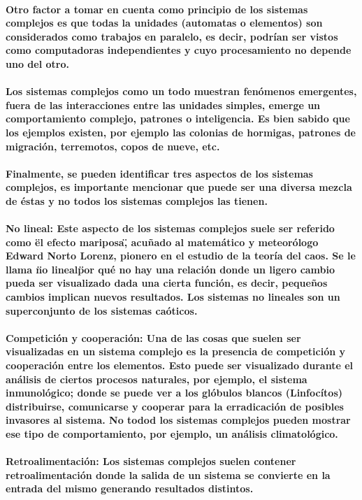      \paragraph{Otro factor a tomar en cuenta como principio de los sistemas complejos es que todas la unidades (automatas o elementos) son considerados como trabajos en paralelo, es decir, podrían ser vistos como computadoras independientes y cuyo procesamiento no depende uno del otro.}
      \paragraph{Los sistemas complejos como un todo muestran fenómenos emergentes, fuera de las interacciones entre las unidades simples, emerge un comportamiento complejo, patrones o inteligencia. Es bien sabido que los ejemplos existen, por ejemplo las colonias de hormigas, patrones de migración, terremotos, copos de nueve, etc.}
      \paragraph{Finalmente, se pueden identificar tres aspectos de los sistemas complejos, es importante mencionar que puede ser una diversa mezcla de éstas y no todos los sistemas complejos las tienen.}
      \paragraph{\textbf{No lineal}: Este aspecto de los sistemas complejos suele ser referido como \"el efecto mariposa\", acuñado al matemático y meteorólogo Edward Norto Lorenz, pionero en el estudio de la teoría del caos. Se le llama \"no lineal\" por qué no hay una relación donde un ligero cambio pueda ser visualizado dada una cierta función, es decir, pequeños cambios implican nuevos resultados. Los sistemas no lineales son un superconjunto de los sistemas caóticos.}
      \paragraph{\textbf{Competición y cooperación}: Una de las cosas que suelen ser visualizadas en un sistema complejo es la presencia de competición y cooperación entre los elementos. Esto puede ser visualizado durante el análisis de ciertos procesos naturales, por ejemplo, el sistema inmunológico; donde se puede ver a los glóbulos blancos (Linfocítos) distribuirse, comunicarse y cooperar para la erradicación de posibles invasores al sistema. No todod los sistemas complejos pueden mostrar ese tipo de comportamiento, por ejemplo, un análisis climatológico.}
      \paragraph{\textbf{Retroalimentación}: Los sistemas complejos suelen contener retroalimentación donde la salida de un sistema se convierte en la entrada del mismo generando resultados distintos.}


